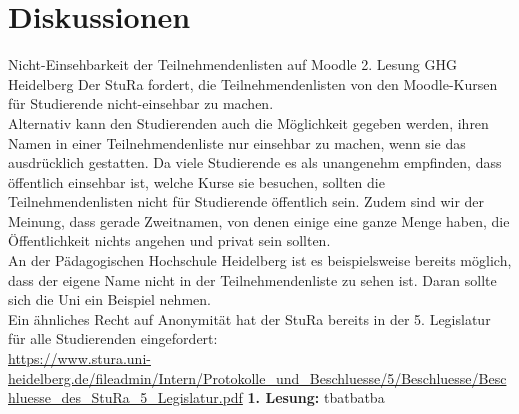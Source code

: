 \section{Diskussionen}

\antrag
{
    Nicht-Einsehbarkeit der Teilnehmendenlisten auf Moodle
}{
    2. Lesung
}{
    GHG Heidelberg
}{
    Der StuRa fordert, die Teilnehmendenlisten von den Moodle-Kursen für Studierende nicht-einsehbar zu
    machen.\\
    Alternativ kann den Studierenden auch die Möglichkeit gegeben werden, ihren Namen in einer
    Teilnehmendenliste nur einsehbar zu machen, wenn sie das ausdrücklich gestatten.
}{
    Da viele Studierende es als unangenehm empfinden, dass öffentlich einsehbar ist, welche Kurse sie
    besuchen, sollten die Teilnehmendenlisten nicht für Studierende öffentlich sein. Zudem sind wir der
    Meinung, dass gerade Zweitnamen, von denen einige eine ganze Menge haben, die Öffentlichkeit nichts
    angehen und privat sein sollten.\\
    An der Pädagogischen Hochschule Heidelberg ist es beispielsweise bereits möglich, dass der eigene
    Name nicht in der Teilnehmendenliste zu sehen ist. Daran sollte sich die Uni ein Beispiel nehmen.\\
    Ein ähnliches Recht auf Anonymität hat der StuRa bereits in der 5. Legislatur für alle Studierenden
    eingefordert:\\
    \url{https://www.stura.uni-heidelberg.de/fileadmin/Intern/Protokolle_und_Beschluesse/5/Beschluesse/Beschluesse_des_StuRa_5_Legislatur.pdf}
}{\textbf{1. Lesung:}
    \ul{
            \ul{}
            \ul{}
            \ul{}
            \ul{}
            \ul{}
    }
}{tba}{tba}{tba}

